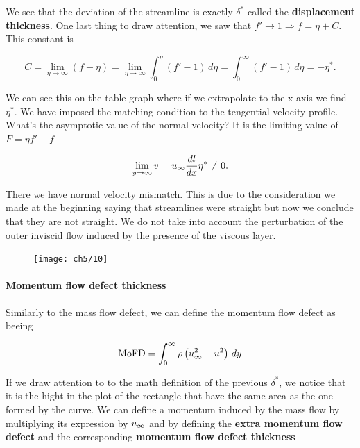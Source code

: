 			We see that the deviation of the streamline is exactly $\delta ^*$ called the \textbf{displacement thickness}. One last thing to draw attention, we saw that $f'  \rightarrow 1 \Rightarrow f = \eta + C$. This constant is 
			
			\begin{equation}
				C = \lim _{\eta \rightarrow \infty}  (f-\eta ) = \lim _{\eta \rightarrow \infty}  \int _0 ^\eta (f'-1) \, d\eta = \int _0^\infty (f'-1)\, d\eta = -\eta ^*.
			\end{equation}
			
			We can see this on the table graph where if we extrapolate to the x axis we find $\eta ^*$. We have imposed the matching condition to the tengential velocity profile. What's the asymptotic value of the normal velocity? It is the limiting value of $F = \eta f' - f$ 
			
			\begin{equation}
				\lim _{y \rightarrow \infty} v = u_\infty \frac{dl}{dx}\eta ^*\neq 0.
			\end{equation}
			
			There we have normal velocity mismatch. This is due to the consideration we made at the beginning saying that streamlines were straight but now we conclude that they are not straight. We do not take into account the perturbation of the outer inviscid flow induced by the presence of the viscous layer. 
			
			\begin{figure}
			\vspace{0mm}
			\texttt{[image: ch5/10]}
			\label{fig:5.10}
			\end{figure}
			\paragraph{Momentum flow defect thickness}
			Similarly to the mass flow defect, we can define the momentum flow defect as beeing 
			
			\begin{equation}
				\mbox{MoFD} = \int_0^\infty \rho \left(  u_\infty ^2 - u^2 \right) \, dy
			\end{equation}
		
			If we draw attention to to the math definition of the previous $\delta ^*$, we notice that it is the hight in the plot of the rectangle that have the same area as the one formed by the curve. We can define a momentum induced by the mass flow by multiplying its expression by $u_\infty$ and by defining the \textbf{extra momentum flow defect} and the corresponding \textbf{momentum flow defect thickness}
			
